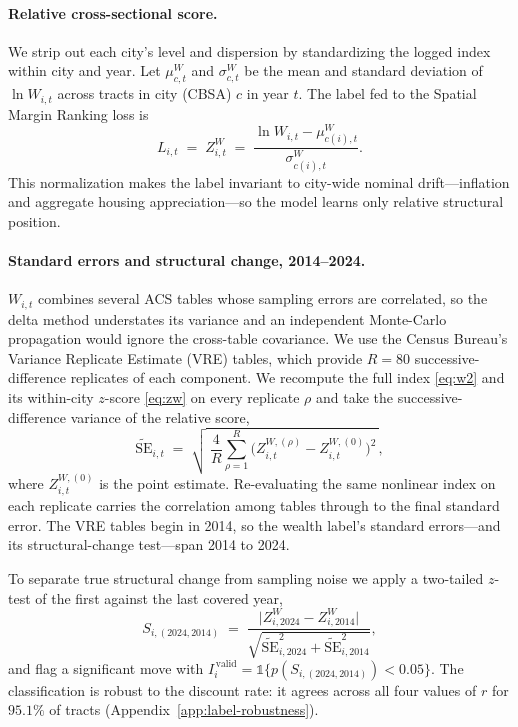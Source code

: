 \paragraph{Relative cross-sectional score.}
We strip out each city's level and dispersion by standardizing the logged index within city
and year. Let $\mu^{W}_{c,t}$ and $\sigma^{W}_{c,t}$ be the mean and standard deviation of
$\ln W_{i,t}$ across tracts in city (CBSA) $c$ in year $t$. The label fed to the Spatial
Margin Ranking loss is
\begin{equation}
L_{i,t} \;=\; Z^{W}_{i,t} \;=\; \frac{\ln W_{i,t} - \mu^{W}_{c(i),t}}{\sigma^{W}_{c(i),t}}.
\label{eq:zw}
\end{equation}
This normalization makes the label invariant to city-wide nominal drift---inflation and
aggregate housing appreciation---so the model learns only relative structural position.

\paragraph{Standard errors and structural change, 2014--2024.}
$W_{i,t}$ combines several ACS tables whose sampling errors are correlated, so the delta
method understates its variance and an independent Monte-Carlo propagation would ignore the
cross-table covariance. We use the Census Bureau's Variance Replicate Estimate (VRE) tables,
which provide $R=80$ successive-difference replicates of each component. We recompute the full
index \eqref{eq:w2} and its within-city $z$-score \eqref{eq:zw} on every replicate $\rho$ and
take the successive-difference variance of the relative score,
\begin{equation}
\widetilde{\mathrm{SE}}_{i,t}
\;=\; \sqrt{\;\frac{4}{R}\sum_{\rho=1}^{R}\big(Z^{W,(\rho)}_{i,t} - Z^{W,(0)}_{i,t}\big)^{2}\,},
\label{eq:sdr}
\end{equation}
where $Z^{W,(0)}_{i,t}$ is the point estimate. Re-evaluating the same nonlinear index on each
replicate carries the correlation among tables through to the final standard error. The VRE
tables begin in 2014, so the wealth label's standard errors---and its structural-change
test---span 2014 to 2024.

To separate true structural change from sampling noise we apply a two-tailed $z$-test of the
first against the last covered year,
\begin{equation}
S_{i,(2024,2014)} \;=\; \frac{\big|Z^{W}_{i,2024} - Z^{W}_{i,2014}\big|}
{\sqrt{\widetilde{\mathrm{SE}}_{i,2024}^{2} + \widetilde{\mathrm{SE}}_{i,2014}^{2}}},
\label{eq:sbreak-w}
\end{equation}
and flag a significant move with $I^{\,\mathrm{valid}}_{i}=\mathbb{1}\{p(S_{i,(2024,2014)})<0.05\}$.
The classification is robust to the discount rate: it agrees across all four values of $r$ for
$95.1\%$ of tracts (Appendix~\ref{app:label-robustness}).


